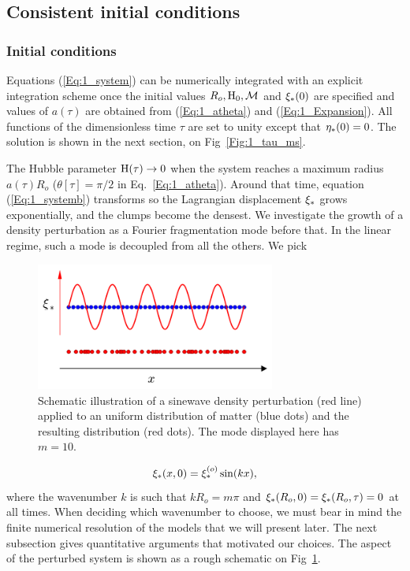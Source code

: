 \subsection{Consistent initial conditions} 
\subsubsection{Initial conditions} 
Equations (\ref{Eq:1_system}) can be numerically integrated with an explicit integration scheme once the initial values $R_o, {\textrm{H}}_0, {\cal M}$ and $\xi_\ast(0)$ are specified and values of $a(\tau)$ are obtained from (\ref{Eq:1_atheta}) and (\ref{Eq:1_Expansion}). All functions of the dimensionless time $\tau$ are set to unity except that $\eta_\ast(0) = 0$. The solution is shown in the next section,  on Fig~\ref{Fig:1_tau_ms}.


The Hubble parameter ${\textrm{H}}(\tau) \rightarrow 0$ when the system reaches a maximum radius $a(\tau)R_o$ ($\theta[\tau]=\pi/2$ in Eq.~\ref{Eq:1_atheta}). Around that time, equation (\ref{Eq:1_systemb}) transforms so the Lagrangian displacement $\xi_\ast$ grows exponentially, and the clumps become the densest. We investigate the growth of a density perturbation as a Fourier fragmentation mode before that. In the linear regime, such a mode is decoupled from all the others. We pick 

 \begin{figure}
	\center
 	\includegraphics[width=0.7\textwidth]{Figures/1_perturbation.png}
	\caption{Schematic illustration of a sinewave density perturbation (red line) applied to an uniform distribution of matter (blue dots) and the resulting distribution (red dots). The mode displayed here has $m=10$.} 
	\label{Fig:1_perturbation}
\end{figure}

\begin{equation} 
\label{Eq:1_FourierMode} 
   \xi_\ast(x,0) = \xi_\ast^{(o)} \sin( kx ) ,
\end{equation}  
where the wavenumber $k$ is such that $k R_o = m \pi$ and $\xi_\ast(R_o,0) = \xi_\ast(R_o,\tau) = 0$ at all times. When deciding which wavenumber to choose, we must bear in mind the finite numerical resolution of the models that we will present later. The next subsection gives quantitative arguments that motivated our choices.  
The aspect of the perturbed system is shown as a rough schematic on Fig~\ref{Fig:1_perturbation}.

